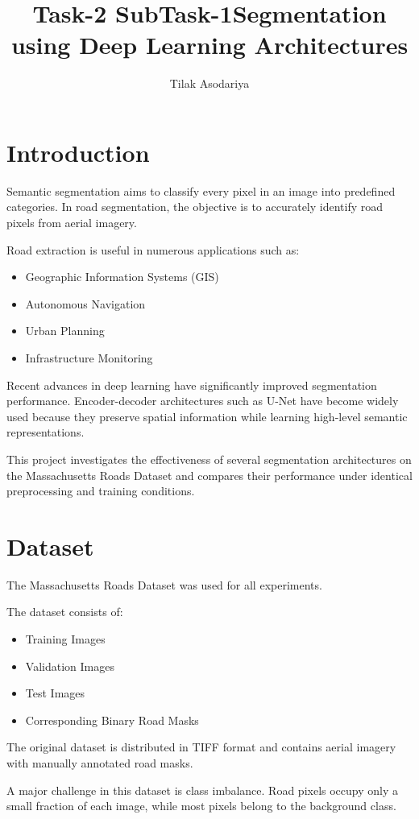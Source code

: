 \documentclass[12pt]{article}
\title{\textbf{Task-2 SubTask-1}\Road Segmentation using Deep Learning Architectures}
\author{Tilak Asodariya}
\begin{document}
\section{Introduction}

Semantic segmentation aims to classify every pixel in an image into predefined categories. In road segmentation, the objective is to accurately identify road pixels from aerial imagery.

Road extraction is useful in numerous applications such as:

\begin{itemize}
\item Geographic Information Systems (GIS)
\item Autonomous Navigation
\item Urban Planning
\item Infrastructure Monitoring
\end{itemize}

Recent advances in deep learning have significantly improved segmentation performance. Encoder-decoder architectures such as U-Net have become widely used because they preserve spatial information while learning high-level semantic representations.

This project investigates the effectiveness of several segmentation architectures on the Massachusetts Roads Dataset and compares their performance under identical preprocessing and training conditions.

\section{Dataset}

The Massachusetts Roads Dataset was used for all experiments.

The dataset consists of:

\begin{itemize}
\item Training Images
\item Validation Images
\item Test Images
\item Corresponding Binary Road Masks
\end{itemize}

The original dataset is distributed in TIFF format and contains aerial imagery with manually annotated road masks.

A major challenge in this dataset is class imbalance. Road pixels occupy only a small fraction of each image, while most pixels belong to the background class.
\end{document}
